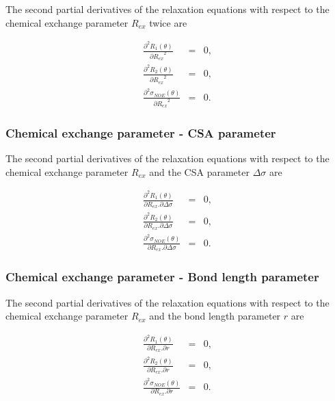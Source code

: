 The second partial derivatives of the relaxation equations with respect to the chemical exchange parameter $R_{ex}$ twice are

\begin{eqnarray}
    \frac{\partial^2 R_1(\theta)}{{\partial R_{ex}}^2} & = & 0,             \label{eq: Ri': d2R1/dRex2} \\
    \frac{\partial^2 R_2(\theta)}{{\partial R_{ex}}^2} & = & 0,             \label{eq: Ri': d2R2/dRex2} \\
    \frac{\partial^2 \sigma_{NOE}(\theta)}{{\partial R_{ex}}^2} & = & 0.    \label{eq: Ri': d2sigmaNOE/dRex2}
\end{eqnarray}


\subsubsection{Chemical exchange parameter - CSA parameter}

The second partial derivatives of the relaxation equations with respect to the chemical exchange parameter $R_{ex}$ and the CSA parameter $\Delta\sigma$ are

\begin{eqnarray}
    \frac{\partial^2 R_1(\theta)}{\partial R_{ex} . \partial \Delta\sigma} & = & 0,             \label{eq: Ri': d2R1/dRex.dCSA} \\
    \frac{\partial^2 R_2(\theta)}{\partial R_{ex} . \partial \Delta\sigma} & = & 0,             \label{eq: Ri': d2R2/dRex.dCSA} \\
    \frac{\partial^2 \sigma_{NOE}(\theta)}{\partial R_{ex} . \partial \Delta\sigma} & = & 0.    \label{eq: Ri': d2sigmaNOE/dRex.dCSA}
\end{eqnarray}


\subsubsection{Chemical exchange parameter - Bond length parameter}

The second partial derivatives of the relaxation equations with respect to the chemical exchange parameter $R_{ex}$ and the bond length parameter $r$ are

\begin{eqnarray}
    \frac{\partial^2 R_1(\theta)}{\partial R_{ex} . \partial r} & = & 0,            \label{eq: Ri': d2R1/dRex.dr} \\
    \frac{\partial^2 R_2(\theta)}{\partial R_{ex} . \partial r} & = & 0,            \label{eq: Ri': d2R2/dRex.dr} \\
    \frac{\partial^2 \sigma_{NOE}(\theta)}{\partial R_{ex} . \partial r} & = & 0.   \label{eq: Ri': d2sigmaNOE/dRex.dr}
\end{eqnarray}


